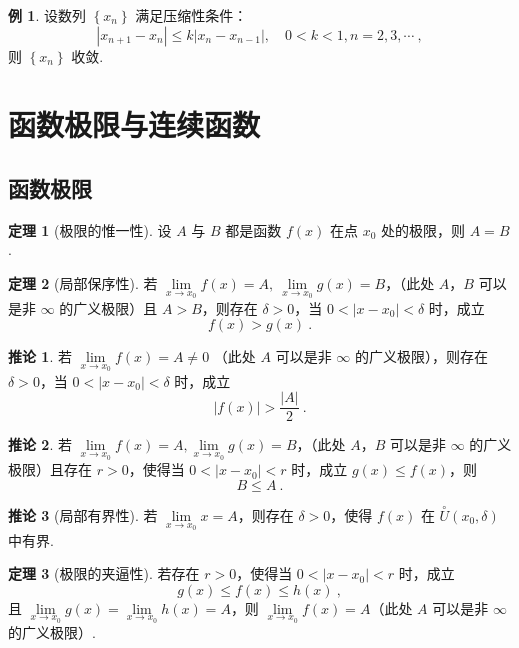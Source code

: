 \documentclass[zihao=-4,linespread=1.8,UTF8,nothm]{aytony_base}
\theoremstyle{definition}
\newtheorem{theorem}{\indent\heiti\textbf{定理}}[subsection]
\newtheorem*{corollary}{\indent\heiti\textbf{推论}}
\newtheorem{example}{\indent\heiti\textbf{例}}[subsection]
\begin{document}
\setcounter{example}{13}
\begin{example}
    设数列 $\left\{x_n\right\}$ 满足压缩性条件：$$
        |x_{n+1} - x_n| \leqslant k|x_n - x_{n-1}|,\quad 0 < k < 1, n = 2, 3, \cdots\ ,
    $$ 则 $\left\{x_n\right\}$ 收敛.
\end{example}

\section{函数极限与连续函数}

\subsection{函数极限}

\begin{theorem}[极限的惟一性]
    设 $A$ 与 $B$ 都是函数 $f(x)$ 在点 $x_0$ 处的极限，则 $A = B$.
\end{theorem}

\begin{theorem}[局部保序性]
    若 $\lim\limits_{x \to x_0} f(x) = A,\ \lim\limits_{x \to x_0} g(x) = B$，（此处 $A$，$B$ 可以是非 $\infty$ 的广义极限）且 $A > B$，则存在 $\delta > 0$，当 $0 < |x - x_0| < \delta$ 时，成立 $$
        f(x) > g(x)\ .
    $$
\end{theorem}

\begin{corollary}
    若 $\lim\limits_{x \to x_0} f(x) = A \neq 0$ （此处 $A$ 可以是非 $\infty$ 的广义极限），则存在 $\delta > 0$，当 $0 < |x - x_0| < \delta$ 时，成立 $$
        \left|f(x)\right| > \dfrac{|A|}{2}\ .
    $$
\end{corollary}

\begin{corollary}
    若 $\lim\limits_{x \to x_0}f(x) = A,\lim\limits_{x \to x_0} g(x) = B $，（此处 $A$，$B$ 可以是非 $\infty$ 的广义极限）且存在 $r > 0$，使得当 $0 < |x-x_0| < r$ 时，成立 $g(x) \leqslant f(x)$，则 $$
        B \leqslant A\ .
    $$
\end{corollary}

\begin{corollary}[局部有界性]
    若 $\lim\limits_{x \to x_0} x = A$，则存在 $\delta> 0$，使得 $f(x)$ 在 $\overset{\circ}{U}(x_0, \delta)$ 中有界.
\end{corollary}

\begin{theorem}[极限的夹逼性]
    若存在 $r > 0$，使得当 $0 < |x-x_0| < r$ 时，成立 $$
        g(x) \leqslant f(x) \leqslant h(x)\ ,
    $$ 且 $\lim\limits_{x \to x_0}g(x) = \lim\limits_{x \to x_0} h(x) = A $，则 $\lim\limits_{x \to x_0} f(x) = A$（此处 $A$ 可以是非 $\infty$ 的广义极限）.
\end{theorem}
\end{document}
